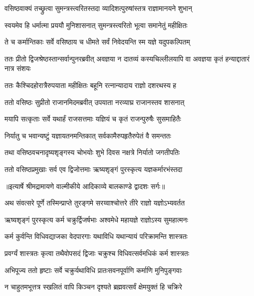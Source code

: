 \twolineshloka
{वसिष्ठवाक्यं तच्छ्रुत्वा सुमन्त्रस्त्वरितस्तदा}
{व्यादिशत्पुरुषांस्तत्र राज्ञामानयने शुभान्} %

\twolineshloka
{स्वयमेव हि धर्मात्मा प्रययौ मुनिशासनात्}
{सुमन्त्रस्त्वरितो भूत्वा समानेतुं महीक्षितः} %

\twolineshloka
{ते च कर्मान्तिकाः सर्वे वसिष्ठाय च धीमते}
{सर्वं निवेदयन्ति स्म यज्ञे यदुपकल्पितम्} %

\threelineshloka
{ततः प्रीतो द्विजश्रेष्ठस्तान्सर्वान्पुनरब्रवीत्}
{अवज्ञया न दातव्यं कस्यचिल्लीलयापि वा}
{अवज्ञया कृतं हन्याद्दातारं नात्र संशयः} %

\twolineshloka
{ततः कैश्चिदहोरात्रैरुपयाता महीक्षितः}
{बहूनि रत्नान्यादाय राज्ञो दशरथस्य ह} %

\twolineshloka
{ततो वसिष्ठः सुप्रीतो राजानमिदमब्रवीत्}
{उपयाता नरव्याघ्र राजानस्तव शासनात्} %

\twolineshloka
{मयापि सत्कृताः सर्वे यथार्हं राजसत्तमाः}
{यज्ञियं च कृतं राजन्पुरुषैः सुसमाहितैः} %

\twolineshloka
{निर्यातु च भवान्यष्टुं यज्ञायतनमन्तिकात्}
{सर्वकामैरुपहृतैरुपेतं वै समन्ततः} %

\twolineshloka
{तथा वसिष्ठवचनादृष्यशृङ्गस्य चोभयोः}
{शुभे दिवस नक्षत्रे निर्यातो जगतीपतिः} %

\twolineshloka
{ततो वसिष्ठप्रमुखाः सर्व एव द्विजोत्तमाः}
{ऋष्यशृङ्गं पुरस्कृत्य यज्ञकर्मारभंस्तदा} %


{॥इत्यार्षे श्रीमद्रामायणे वाल्मीकीये आदिकाव्ये बालकाण्डे द्वादशः सर्गः॥}


\twolineshloka
{अथ संवत्सरे पूर्णे तस्मिन्प्राप्ते तुरङ्गमे}
{सरय्वाश्चोत्तरे तीरे राज्ञो यज्ञोऽभ्यवर्तत} %

\twolineshloka
{ऋष्यशृङ्गं पुरस्कृत्य कर्म चक्रुर्द्विजर्षभाः}
{अश्वमेधे महायज्ञे राज्ञोऽस्य सुमहात्मनः} %

\twolineshloka
{कर्म कुर्वन्ति विधिवद्याजका वेदपारगाः}
{यथाविधि यथान्यायं परिक्रामन्ति शास्त्रतः} %

\twolineshloka
{प्रवर्ग्यं शास्त्रतः कृत्वा तथैवोपसदं द्विजाः}
{चक्रुश्च विधिवत्सर्वमधिकं कर्म शास्त्रतः} %

\twolineshloka
{अभिपूज्य ततो हृष्टाः सर्वे चक्रुर्यथाविधि}
{प्रातःसवनपूर्वाणि कर्माणि मुनिपुङ्गवाः} %

\twolineshloka
{न चाहुतमभूत्तत्र स्खलितं वापि किञ्चन}
{दृश्यते ब्रह्मवत्सर्वं क्षेमयुक्तं हि चक्रिरे} %

